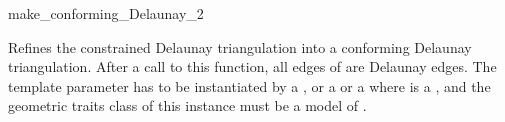 \begin{ccRefFunction}{make_conforming_Delaunay_2}


{ Refines the constrained Delaunay triangulation  into a
  conforming Delaunay triangulation. After a call to this function,
  all edges of  are Delaunay edges. 
  \ccPrecond The template parameter  has to be instantiated
  by a , or a
   or a
   where  is a
  , and the
  geometric traits class of this instance must be a model of
  . }

\end{ccRefFunction}

